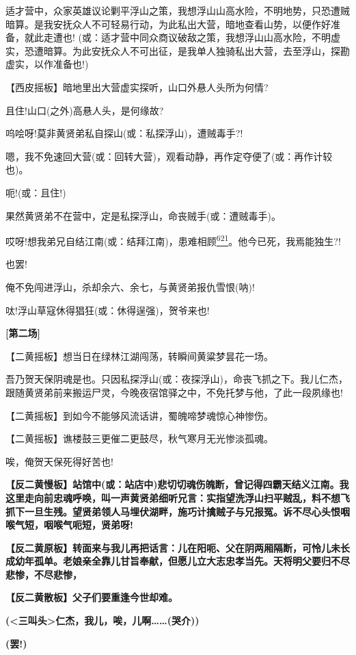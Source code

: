 适才营中，众家英雄议论剿平浮山之策，我想浮山山高水险，不明地势，只恐遭贼暗算。是我安抚众人不可轻易行动，为此私出大营，暗地查看山势，以便作好准备，就此走遭也!
(或：适才营中同众商议破敌之策，我想浮山山高水险，不明虚实，恐遭暗算。为此安抚众人不可出征，是我单人独骑私出大营，去至浮山，探勘虚实，以作准备也!)

【西皮摇板】暗地里出大营虚实探听，山口外悬人头所为何情?

且住!山口(之外)高悬人头，是何缘故?

呜哙呀!莫非黄贤弟私自探山(或：私探浮山)，遭贼毒手?!

嗯，我不免速回大营(或：回转大营)，观看动静，再作定夺便了(或：再作计较也)。

呃!(或：且住!)

果然黄贤弟不在营中，定是私探浮山，命丧贼手(或：遭贼毒手)。

哎呀!想我弟兄自结江南(或：结拜江南)，患难相顾\protect\hyperlink{fn621}{\textsuperscript{621}}。他今已死，我焉能独生?!

也罢!

俺不免闯进浮山，杀却余六、余七，与黄贤弟报仇雪恨(呐)!

呔!浮山草寇休得猖狂(或：休得逞强)，贺爷来也!

\textbf{{[}第二场{]}}

【二黄摇板】想当日在绿林江湖闯荡，转瞬间黄粱梦昙花一场。

吾乃贺天保阴魂是也。只因私探浮山(或：夜探浮山)，命丧飞抓之下。我儿仁杰，跟随黄贤弟前来搬运尸灵，今晚夜宿馆驿之中，不免托梦与他，了此一段夙缘也!

【二黄摇板】到如今不能够风流话讲，蜀魄啼梦魂惊心神惨伤。

【二黄摇板】谯楼鼓三更催二更鼓尽，秋气寒月无光惨淡孤魂。

唉，俺贺天保死得好苦也!

\textbf{【反二黄慢板】站馆中(或：站店中)悲切切魂伤魄断，曾记得四霸天结义江南。我这里走向前忠魂呼唤，叫一声黄贤弟细听兄言：实指望洗浮山扫平贼乱，料不想飞抓下一旦生残。望贤弟领人马埋伏湖畔，施巧计擒贼子与兄报冤。诉不尽心头恨咽喉气短，咽喉气呃短，贤弟呀!}

\textbf{【反二黄原板】转面来与我儿再把话言：儿在阳呃、父在阴两厢隔断，可怜儿未长成幼年孤单。老娘亲全靠儿甘旨奉献，但愿儿立大志忠孝当先。天将明父要归不尽悲惨，不尽悲惨，}

\textbf{【反二黄散板】父子们要重逢今世却难。}

\textbf{(\textless{}三叫头\textgreater{}仁杰，我儿，唉，儿啊\ldots{}\ldots{}(哭介))}

\textbf{(罢!)}


